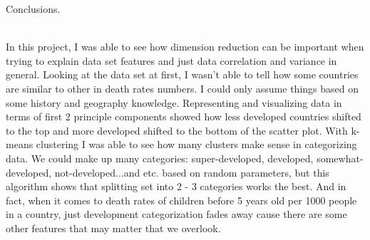 \documentclass[12pt, letterpaper]{article}
\begin{document}
\begin{enumerate}[label=\Roman*.]
	  {\bf \item Conclusions.}\\
	  
	  In this project, I was able to see how dimension reduction can be important when trying to explain data set features and just data correlation and variance in general. Looking at the data set at first, I wasn't able to tell how some countries are similar to other in death rates numbers. I could only assume things based on some history and geography knowledge. Representing and visualizing data in terms of first 2 principle components showed how less developed countries shifted to the top and more developed shifted to the bottom of the scatter plot. 
	  With k-means clustering I was able to see how many clusters make sense in categorizing data. We could make up many categories: super-developed, developed, somewhat-developed, not-developed...and etc. based on random parameters, but this algorithm shows that splitting set into 2 - 3 categories works the best. And in fact, when it comes to death rates of children before 5 years old per 1000 people in a country, just development categorization fades away cause there are some other features that may matter that we overlook.
	  
\end{enumerate}
	
	
	
	
	
	
	
\end{document}
